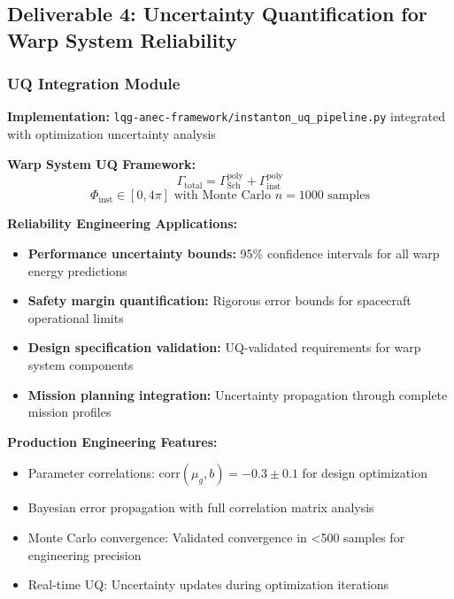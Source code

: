 \documentclass[11pt]{article}
\begin{document}
\subsection{Deliverable 4: Uncertainty Quantification for Warp System Reliability}

\subsubsection{UQ Integration Module}
\textbf{Implementation:} \texttt{lqg-anec-framework/instanton\_uq\_pipeline.py} integrated with optimization uncertainty analysis

\textbf{Warp System UQ Framework:}
\begin{equation}
\Gamma_{\text{total}} = \Gamma_{\text{Sch}}^{\text{poly}} + \Gamma_{\text{inst}}^{\text{poly}}
\end{equation}
\begin{equation}
\Phi_{\text{inst}} \in [0, 4\pi] \text{ with Monte Carlo } n = 1000 \text{ samples}
\end{equation}

\textbf{Reliability Engineering Applications:}
\begin{itemize}
    \item \textbf{Performance uncertainty bounds:} 95\% confidence intervals for all warp energy predictions
    \item \textbf{Safety margin quantification:} Rigorous error bounds for spacecraft operational limits
    \item \textbf{Design specification validation:} UQ-validated requirements for warp system components
    \item \textbf{Mission planning integration:} Uncertainty propagation through complete mission profiles
\end{itemize}

\textbf{Production Engineering Features:}
\begin{itemize}
    \item Parameter correlations: $\text{corr}(\mu_g, b) = -0.3 \pm 0.1$ for design optimization
    \item Bayesian error propagation with full correlation matrix analysis
    \item Monte Carlo convergence: Validated convergence in <500 samples for engineering precision
    \item Real-time UQ: Uncertainty updates during optimization iterations
\end{itemize}
\end{document}
